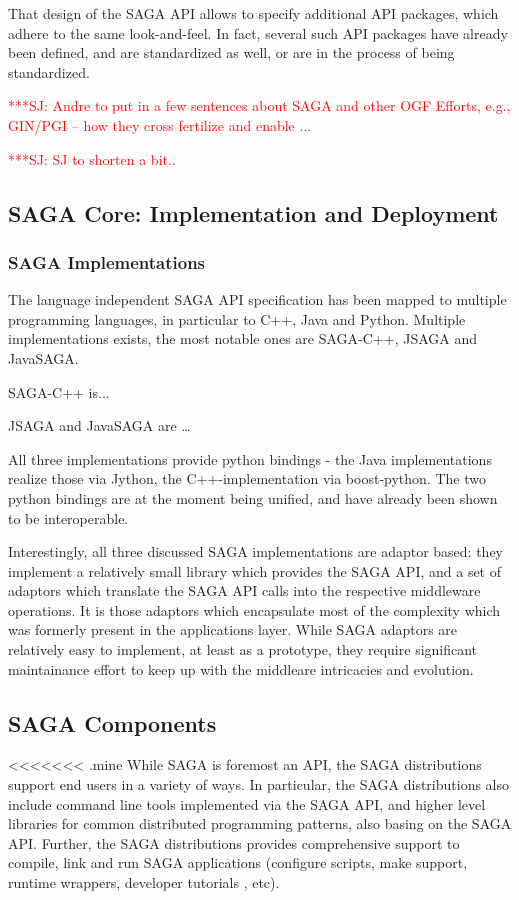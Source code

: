 \documentclass[12pt]{article}
\newcommand{\jhanote}[1]{ {\textcolor{red}     {***SJ: #1}}}
\newcommand{\jhanote}[1]{}
\begin{document}
  That design of the SAGA API allows to specify additional API
  packages, which adhere to the same look-and-feel.  In fact, several
  such API packages have already been defined, and are standardized as
  well, or are in the process of being standardized.

  \jhanote{Andre to put in a few sentences about SAGA and other OGF
    Efforts, e.g., GIN/PGI -- how they cross fertilize and enable ...}

  \jhanote{SJ to shorten a bit..}

  \subsection{SAGA Core: Implementation and Deployment}

  \subsubsection{SAGA Implementations}

  The language independent SAGA API specification has been mapped to
  multiple programming languages, in particular to C++, Java and
  Python.  Multiple implementations exists, the most notable ones are
  SAGA-C++, JSAGA and JavaSAGA.

  SAGA-C++ is...

  JSAGA and JavaSAGA are …

  All three implementations provide python bindings - the Java
  implementations realize those via Jython, the C++-implementation via
  boost-python.  The two python bindings are at the moment being
  unified, and have already been shown to be interoperable.

  Interestingly, all three discussed SAGA implementations are adaptor
  based: they implement a relatively small library which provides the
  SAGA API, and a set of adaptors which translate the SAGA API calls
  into the respective middleware operations.  It is those adaptors
  which encapsulate most of the complexity which was formerly present
  in the applications layer.  While SAGA adaptors are relatively easy
  to implement, at least as a prototype, they require significant
  maintainance effort to keep up with the middleare intricacies and
  evolution.

 \subsection{SAGA Components}

<<<<<<< .mine
  While SAGA is foremost an API, the SAGA distributions support end
  users in a variety of ways.  In particular, the SAGA distributions
  also include command line tools implemented via the SAGA API, and
  higher level libraries for common distributed programming patterns,
  also basing on the SAGA API.  Further, the SAGA distributions
  provides comprehensive support to compile, link and run SAGA
  applications (configure scripts, make support, runtime wrappers,
  developer tutorials , etc).
\end{document}
